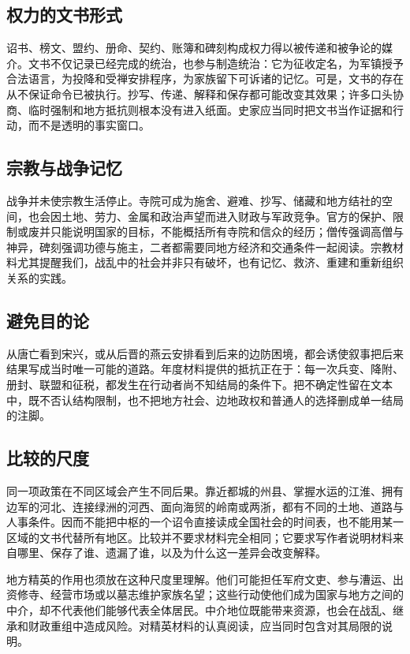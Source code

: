 \subsection{权力的文书形式}
诏书、榜文、盟约、册命、契约、账簿和碑刻构成权力得以被传递和被争论的媒介。文书不仅记录已经完成的统治，也参与制造统治：它为征收定名，为军镇授予合法语言，为投降和受禅安排程序，为家族留下可诉诸的记忆。可是，文书的存在从不保证命令已被执行。抄写、传递、解释和保存都可能改变其效果；许多口头协商、临时强制和地方抵抗则根本没有进入纸面。史家应当同时把文书当作证据和行动，而不是透明的事实窗口。

\subsection{宗教与战争记忆}
战争并未使宗教生活停止。寺院可成为施舍、避难、抄写、储藏和地方结社的空间，也会因土地、劳力、金属和政治声望而进入财政与军政竞争。官方的保护、限制或废并只能说明国家的目标，不能概括所有寺院和信众的经历；僧传强调高僧与神异，碑刻强调功德与施主，二者都需要同地方经济和交通条件一起阅读。宗教材料尤其提醒我们，战乱中的社会并非只有破坏，也有记忆、救济、重建和重新组织关系的实践。

\subsection{避免目的论}
从唐亡看到宋兴，或从后晋的燕云安排看到后来的边防困境，都会诱使叙事把后来结果写成当时唯一可能的道路。年度材料提供的抵抗正在于：每一次兵变、降附、册封、联盟和征税，都发生在行动者尚不知结局的条件下。把不确定性留在文本中，既不否认结构限制，也不把地方社会、边地政权和普通人的选择删成单一结局的注脚。

\subsection{比较的尺度}
同一项政策在不同区域会产生不同后果。靠近都城的州县、掌握水运的江淮、拥有边军的河北、连接绿洲的河西、面向海贸的岭南或两浙，都有不同的土地、道路与人事条件。因而不能把中枢的一个诏令直接读成全国社会的时间表，也不能用某一区域的文书代替所有地区。比较并不要求材料完全相同；它要求写作者说明材料来自哪里、保存了谁、遗漏了谁，以及为什么这一差异会改变解释。

地方精英的作用也须放在这种尺度里理解。他们可能担任军府文吏、参与漕运、出资修寺、经营市场或以墓志维护家族名望；这些行动使他们成为国家与地方之间的中介，却不代表他们能够代表全体居民。中介地位既能带来资源，也会在战乱、继承和财政重组中造成风险。对精英材料的认真阅读，应当同时包含对其局限的说明。

